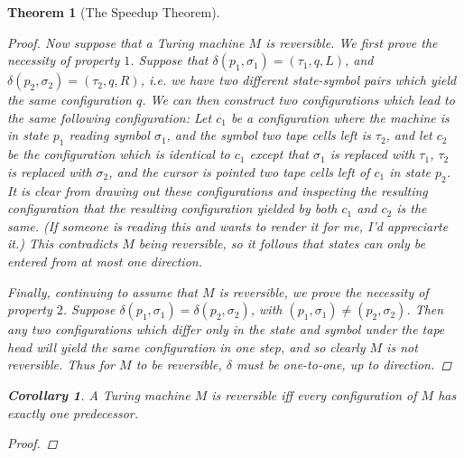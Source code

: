 \documentclass{article}
\theoremstyle{definition}
\theoremstyle{plain}
\theoremstyle{theorem}
\newtheorem{theorem}{Theorem}[section]
\newtheorem{corollary}{Corollary}[section]
\begin{document}
\begin{theorem}[The Speedup Theorem]
\begin{proof}
	\par Now suppose that a Turing machine $M$ is reversible. We first prove the necessity of property $1$. Suppose that $\delta(p_1,\sigma_1) = (\tau_1,q,L)$, and $\delta(p_2,\sigma_2) = (\tau_2,q,R)$, i.e. we have two different state-symbol pairs which yield the same configuration $q$. We can then construct two configurations which lead to the same following configuration: Let $c_1$ be a configuration where the machine is in state $p_1$ reading symbol $\sigma_1$, and the symbol two tape cells left is $\tau_2$, and let $c_2$ be the configuration which is identical to $c_1$ except that $\sigma_1$ is replaced with $\tau_1$, $\tau_2$ is replaced with $\sigma_2$, and the cursor is pointed two tape cells left of $c_1$ in state $p_2$. It is clear from drawing out these configurations and inspecting the resulting configuration that the resulting configuration yielded by both $c_1$ and $c_2$ is the same. (If someone is reading this and wants to render it for me, I'd appreciarte it.) This contradicts $M$ being reversible, so it follows that states can only be entered from at most one direction. 
	\par Finally, continuing to assume that $M$ is reversible, we prove the necessity of property $2$. Suppose $\delta(p_1,\sigma_1) = \delta(p_2,\sigma_2)$, with $(p_1,\sigma_1) \neq (p_2,\sigma_2)$. Then any two configurations which differ only in the state and symbol under the tape head will yield the same configuration in one step, and so clearly $M$ is not reversible. Thus for $M$ to be reversible, $\delta$ must be one-to-one, up to direction. 
\end{proof}
\begin{corollary}
	A Turing machine $M$ is reversible iff every configuration of $M$ has \textit{exactly} one predecessor. 
\end{corollary}
\begin{proof}

\end{proof}
\end{theorem}
\end{document}
